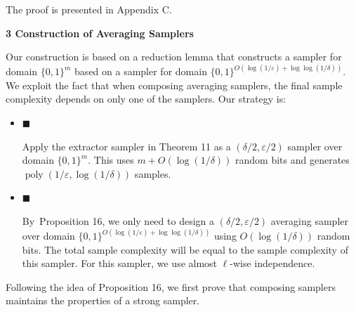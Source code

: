 


The proof is presented in Appendix C.\par






\par\medskip\noindent\textbf{
3 Construction of Averaging Samplers}\par




Our construction is based on a reduction lemma that constructs a sampler for domain $\{0,1\}^{m}$ based on a sampler for domain $\{0,1\}^{O(\log(1/\varepsilon)+\log\log(1/\delta))}$.
We exploit the fact that when composing averaging samplers, the final sample complexity depends on only one of the samplers. Our strategy is:\par


\begin{itemize}


\item[] 
$\blacksquare$ 


Apply the extractor sampler in Theorem 11 as a $(\delta/2,\varepsilon/2)$ sampler over domain $\{0,1\}^{m}$. This uses $m+O(\log(1/\delta))$ random bits and generates $\operatorname*{poly}(1/\varepsilon,\log(1/\delta))$ samples.\par





\item[] 
$\blacksquare$ 


By Proposition 16, we only need to design a $(\delta/2,\varepsilon/2)$ averaging sampler over domain $\{0,1\}^{O(\log(1/\varepsilon)+\log\log(1/\delta))}$ using $O(\log(1/\delta))$ random bits. The total sample complexity will be equal to the sample complexity of this sampler. For this sampler, we use almost $\ell$-wise independence.\par





\end{itemize}




Following the idea of Proposition 16,
we first prove that composing samplers maintains the properties of a strong sampler.\par





